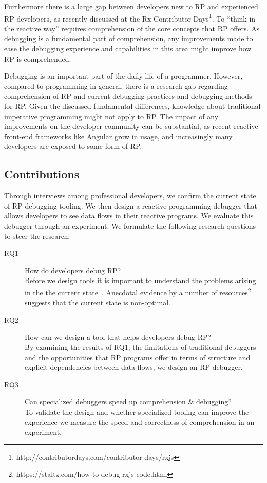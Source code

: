 Furthermore there is a large gap between developers new to RP and experienced RP developers, as recently discussed at the Rx Contributor Days\footnote{\label{foot:contribdays}http://contributordays.com/contributor-days/rxjs}. To ``think in the reactive way'' requires comprehension of the core concepts that RP offers. As debugging is a fundamental part of comprehension, any improvements made to ease the debugging experience and capabilities in this area might improve how RP is comprehended.

Debugging is an important part of the daily life of a programmer. However, compared to programming in general, there is a research gap regarding comprehension of RP and current debugging practices and debugging methods for RP. Given the discussed fundamental differences, knowledge about traditional imperative programming might not apply to RP. The impact of any improvements on the developer community can be substantial, as recent reactive front-end frameworks like Angular grow in usage, and increasingly many developers are exposed to some form of RP.

\subsection{Contributions}
Through interviews among professional developers, we confirm the current state of RP debugging tooling. We then design a reactive programming debugger that allows developers to see data flows in their reactive programs. We evaluate this debugger through an experiment.
We formulate the following research questions to steer the research:

\begin{description}
\item[RQ1] How do developers debug RP? \\
Before we design tools it is important to understand the problems arising in the the current state~\cite{singer2010examination}. Anecdotal evidence by a number of resources\footnote{https://staltz.com/how-to-debug-rxjs-code.html}
suggests that the current state is non-optimal.

\item[RQ2] How can we design a tool that helps developers debug RP? \\
By examining the results of RQ1, the limitations of traditional debuggers and the opportunities that RP programs offer in terms of structure and explicit dependencies between data flows, we design an RP debugger.

\item[RQ3] Can specialized debuggers speed up comprehension \& debugging? \\
To validate the design and whether specialized tooling can improve the experience we measure the speed and correctness of comprehension in an experiment.

\end{description}
